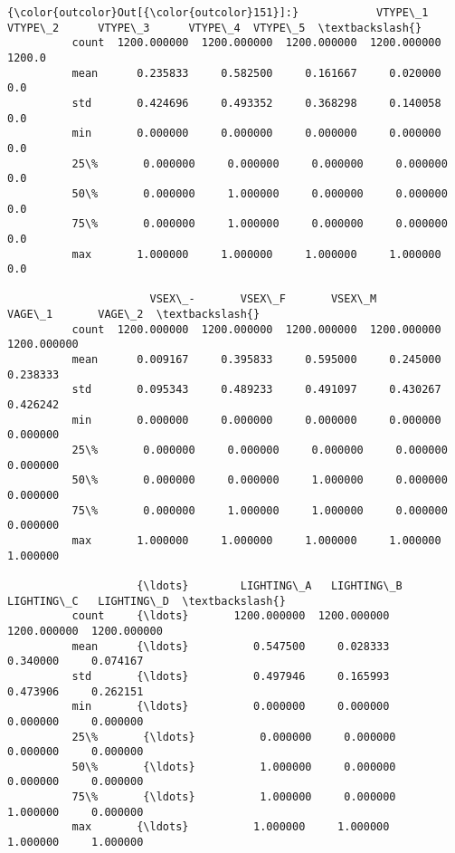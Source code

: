 \documentclass[11pt]{article}
\begin{document}
\begin{Verbatim}[commandchars=\\\{\}]
{\color{outcolor}Out[{\color{outcolor}151}]:}            VTYPE\_1      VTYPE\_2      VTYPE\_3      VTYPE\_4  VTYPE\_5  \textbackslash{}
          count  1200.000000  1200.000000  1200.000000  1200.000000   1200.0   
          mean      0.235833     0.582500     0.161667     0.020000      0.0   
          std       0.424696     0.493352     0.368298     0.140058      0.0   
          min       0.000000     0.000000     0.000000     0.000000      0.0   
          25\%       0.000000     0.000000     0.000000     0.000000      0.0   
          50\%       0.000000     1.000000     0.000000     0.000000      0.0   
          75\%       0.000000     1.000000     0.000000     0.000000      0.0   
          max       1.000000     1.000000     1.000000     1.000000      0.0   
          
                      VSEX\_-       VSEX\_F       VSEX\_M       VAGE\_1       VAGE\_2  \textbackslash{}
          count  1200.000000  1200.000000  1200.000000  1200.000000  1200.000000   
          mean      0.009167     0.395833     0.595000     0.245000     0.238333   
          std       0.095343     0.489233     0.491097     0.430267     0.426242   
          min       0.000000     0.000000     0.000000     0.000000     0.000000   
          25\%       0.000000     0.000000     0.000000     0.000000     0.000000   
          50\%       0.000000     0.000000     1.000000     0.000000     0.000000   
          75\%       0.000000     1.000000     1.000000     0.000000     0.000000   
          max       1.000000     1.000000     1.000000     1.000000     1.000000   
          
                    {\ldots}        LIGHTING\_A   LIGHTING\_B   LIGHTING\_C   LIGHTING\_D  \textbackslash{}
          count     {\ldots}       1200.000000  1200.000000  1200.000000  1200.000000   
          mean      {\ldots}          0.547500     0.028333     0.340000     0.074167   
          std       {\ldots}          0.497946     0.165993     0.473906     0.262151   
          min       {\ldots}          0.000000     0.000000     0.000000     0.000000   
          25\%       {\ldots}          0.000000     0.000000     0.000000     0.000000   
          50\%       {\ldots}          1.000000     0.000000     0.000000     0.000000   
          75\%       {\ldots}          1.000000     0.000000     1.000000     0.000000   
          max       {\ldots}          1.000000     1.000000     1.000000     1.000000   
          

\end{Verbatim}
\end{document}
